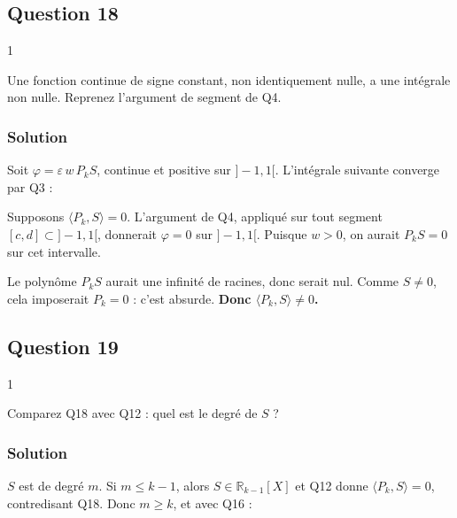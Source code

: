 \documentclass[11pt,a4paper]{article}
\newcommand{\equationajustee}[1]{%
  \sbox{\boiteequation}{$\displaystyle #1$}%
  \ifdim\wd\boiteequation>\linewidth
    \[\resizebox{\linewidth}{!}{\usebox{\boiteequation}}\]%
  \else
    \[#1\]%
  \fi}
\begin{document}
\hypertarget{question-18}{%
\subsection{Question 18}\label{question-18}}

\begin{indication}{1}

Une fonction continue de signe constant, non identiquement nulle, a une intégrale non nulle. Reprenez l'argument de segment de Q4.

\end{indication}

\hypertarget{solution-17}{%
\subsubsection{Solution}\label{solution-17}}

Soit \(\varphi=\varepsilon\,w\,P_kS\), continue et positive sur \(]-1,1[\). L'intégrale suivante converge par Q3 :

\equationajustee{\varepsilon\langle P_k,S\rangle=\int_{-1}^1\varphi.}

Supposons \(\langle P_k,S\rangle=0\). L'argument de Q4, appliqué sur tout segment \([c,d]\subset]-1,1[\), donnerait \(\varphi=0\) sur \(]-1,1[\). Puisque \(w>0\), on aurait \(P_kS=0\) sur cet intervalle.

Le polynôme \(P_kS\) aurait une infinité de racines, donc serait nul. Comme \(S\neq0\), cela imposerait \(P_k=0\) : c'est absurde. \textbf{Donc \(\langle P_k,S\rangle\neq0\).}

\hypertarget{question-19}{%
\subsection{Question 19}\label{question-19}}

\begin{indication}{1}

Comparez Q18 avec Q12 : quel est le degré de \(S\) ?

\end{indication}

\hypertarget{solution-18}{%
\subsubsection{Solution}\label{solution-18}}

\(S\) est de degré \(m\). Si \(m\leqslant k-1\), alors \(S\in\mathbb R_{k-1}[X]\) et Q12 donne \(\langle P_k,S\rangle=0\), contredisant Q18. Donc \(m\geqslant k\), et avec Q16 :
\end{document}
